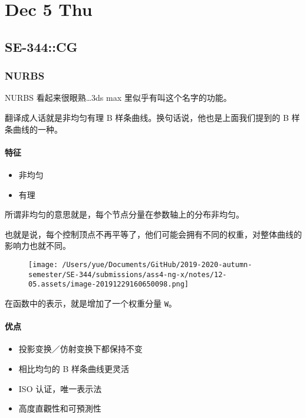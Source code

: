 \documentclass[
]{article}
\date{}
\begin{document}
\hypertarget{header-n0}{%
\section{Dec 5 Thu}\label{header-n0}}

\hypertarget{header-n2}{%
\subsection{SE-344::CG}\label{header-n2}}

\hypertarget{header-n3}{%
\subsubsection{NURBS}\label{header-n3}}

NURBS 看起来很眼熟\ldots3ds max 里似乎有叫这个名字的功能。

翻译成人话就是非均匀有理 B 样条曲线。换句话说，他也是上面我们提到的 B
样条曲线的一种。

\hypertarget{header-n6}{%
\paragraph{特征}\label{header-n6}}

\begin{itemize}
\item
  非均匀
\item
  有理
\end{itemize}

所谓非均匀的意思就是，每个节点分量在参数轴上的分布非均匀。

也就是说，每个控制顶点不再平等了，他们可能会拥有不同的权重，对整体曲线的影响力也就不同。

\begin{figure}
\centering
\texttt{[image: /Users/yue/Documents/GitHub/2019-2020-autumn-semester/SE-344/submissions/ass4-ng-x/notes/12-05.assets/image-20191229160650098.png]}
\caption{}
\end{figure}

在函数中的表示，就是增加了一个权重分量 \texttt{W}。

\hypertarget{header-n16}{%
\paragraph{优点}\label{header-n16}}

\begin{itemize}
\item
  投影变换／仿射变换下都保持不变
\item
  相比均匀的 B 样条曲线更灵活
\item
  ISO 认证，唯一表示法
\item
  高度直觀性和可預測性
\end{itemize}
\end{document}
